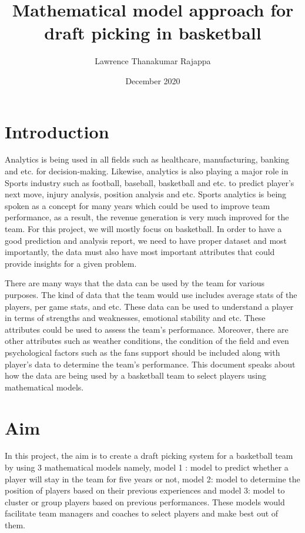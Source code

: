 \documentclass[format=sigconf]{acmart}
\title{Mathematical model approach for draft picking in basketball}
\author{Lawrence Thanakumar Rajappa}
\affiliation{\institution{IDA Linköping University}}
\date{December 2020}
\begin{document}
\maketitle
\pagestyle{plain} %

\section{Introduction}
Analytics is being used in all fields such as healthcare, manufacturing, banking and etc. for decision-making. Likewise, 
analytics is also playing a major role in Sports industry such as football, baseball, basketball and etc. to predict player's 
next move, injury analysis, position analysis and etc. Sports analytics is being spoken as a concept for many years which 
could be used to improve team performance, as a result, the revenue generation is very much improved for the team. For this 
project, we will mostly focus on basketball. In order to have a good prediction and analysis report, we need to have proper
dataset and most importantly, the data must also have most important attributes that could provide insights for a given problem.

There are many ways that the data can be used by the team for various purposes. The kind of data that the team would use includes
average stats of the players, per game stats, and etc. These data can be used to understand a player in terms of strengths and 
weaknesses, emotional stability and etc. These attributes could be used to assess the team's performance. Moreover, there are other 
attributes such as weather conditions, the condition of the field and even psychological factors such as the fans support should be
included along with player's data to determine the team's performance. This document speaks about how the data are being used by
a basketball team to select players using mathematical models.

\section{Aim}
In this project, the aim is to create a draft picking system for a basketball team by using 3 mathematical models namely, model 1 : model
to predict whether a player will stay in the team for five years or not, model 2: model to determine the position of players 
based on their previous experiences and model 3: model to cluster or group players based on previous performances. These models
would facilitate team managers and coaches to select players and make best out of them.
\end{document}
